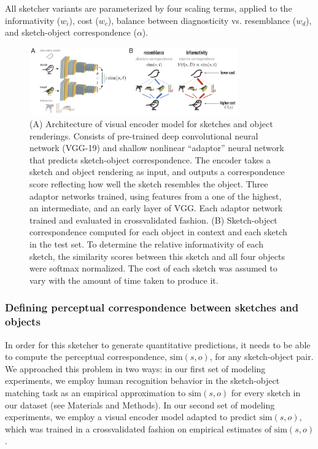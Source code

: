 \documentclass[9pt,twocolumn,twoside]{pnas-new}
\begin{document}
All sketcher variants are parameterized by four scaling terms, applied to the informativity ($w_{i}$), cost ($w_{c}$), balance between diagnosticity vs. resemblance ($w_{d}$), and sketch-object correspondence ($\alpha$).

\begin{figure}[htbp]
\centering
\includegraphics[width=0.8\textwidth]{figures/4_model_schematic.pdf}
\caption{(A) Architecture of visual encoder model for sketches and object renderings. Consists of pre-trained deep convolutional neural network (VGG-19) and shallow nonlinear ``adaptor'' neural network that predicts sketch-object correspondence. 
The encoder takes a sketch and object rendering as input, and outputs a correspondence score reflecting how well the sketch resembles the object. 
Three adaptor networks trained, using features from a one of the highest, an intermediate, and an early layer of VGG.
Each adaptor network trained and evaluated in crossvalidated fashion. 
(B) Sketch-object correspondence computed for each object in context and each sketch in the test set. 
To determine the relative informativity of each sketch, the similarity scores between this sketch and all four objects were softmax normalized. 
The cost of each sketch was assumed to vary with the amount of time taken to produce it.}
\label{model_schematic}
\end{figure}

\subsubsection*{Defining perceptual correspondence between sketches and objects}

In order for this sketcher to generate quantitative predictions, it needs to be able to compute the perceptual correspondence, $\textrm{sim}(s,o)$, for any sketch-object pair. 
We approached this problem in two ways: in our first set of modeling experiments, we employ human recognition behavior in the sketch-object matching task as an empirical approximation to $\textrm{sim}(s,o)$ for every sketch in our dataset (see Materials and Methods). 
In our second set of modeling experiments, we employ a visual encoder model adapted to predict $\textrm{sim}(s,o)$, which was trained in a crossvalidated fashion on empirical estimates of $\textrm{sim}(s,o)$.
\end{document}
